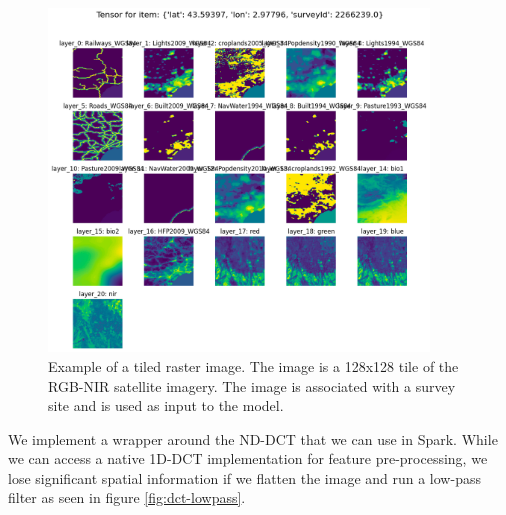\begin{figure}[h!]
    \centering
    \includegraphics[width=0.9\textwidth]{figures/tiled-raster.png}
    \caption{
        Example of a tiled raster image. 
        The image is a 128x128 tile of the RGB-NIR satellite imagery. 
        The image is associated with a survey site and is used as input to the model. 
    }
    \label{fig:tiled-raster}
\end{figure}

We implement a wrapper around the ND-DCT that we can use in Spark. 
While we can access a native 1D-DCT implementation for feature pre-processing, we lose significant spatial information if we flatten the image and run a low-pass filter as seen in figure \ref{fig:dct-lowpass}.

